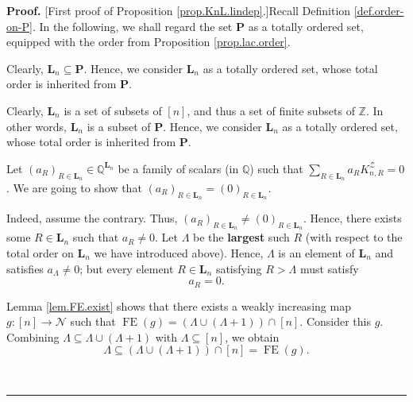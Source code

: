 \documentclass[numbers=enddot,12pt,final,onecolumn,notitlepage]{scrartcl}%
\theoremstyle{definition}
\newenvironment{proof}[1][Proof]{\noindent\textbf{#1.} }{\ \rule{0.5em}{0.5em}}
\newenvironment{verlong}{}{}
\newenvironment{vershort}{}{}
\let\sumnonlimits\sum
\renewcommand{\sum}{\sumnonlimits\limits}
\begin{document}
\begin{proof}
[First proof of Proposition \ref{prop.KnL.lindep}.]Recall Definition
\ref{def.order-on-P}. In the following, we shall regard the set $\mathbf{P}$
as a totally ordered set, equipped with the order from Proposition
\ref{prop.lac.order}.

\begin{vershort}
Clearly, $\mathbf{L}_{n}\subseteq\mathbf{P}$. Hence, we consider
$\mathbf{L}_{n}$ as a totally ordered set, whose total order is inherited from
$\mathbf{P}$.
\end{vershort}

\begin{verlong}
Clearly, $\mathbf{L}_{n}$ is a set of subsets of $\left[  n\right]  $, and
thus a set of finite subsets of $\mathbb{Z}$. In other words, $\mathbf{L}_{n}$
is a subset of $\mathbf{P}$. Hence, we consider $\mathbf{L}_{n}$ as a totally
ordered set, whose total order is inherited from $\mathbf{P}$.
\end{verlong}

Let $\left(  a_{R}\right)  _{R\in\mathbf{L}_{n}}\in\mathbb{Q}^{\mathbf{L}_{n}%
}$ be a family of scalars (in $\mathbb{Q}$) such that $\sum_{R\in
\mathbf{L}_{n}}a_{R}K_{n,R}^{\mathcal{Z}}=0$. We are going to show that
$\left(  a_{R}\right)  _{R\in\mathbf{L}_{n}}=\left(  0\right)  _{R\in
\mathbf{L}_{n}}$.

Indeed, assume the contrary. Thus, $\left(  a_{R}\right)  _{R\in\mathbf{L}%
_{n}}\neq\left(  0\right)  _{R\in\mathbf{L}_{n}}$. Hence, there exists some
$R\in\mathbf{L}_{n}$ such that $a_{R}\neq0$. Let $\Lambda$ be the
\textbf{largest} such $R$ (with respect to the total order on $\mathbf{L}_{n}$
we have introduced above). Hence, $\Lambda$ is an element of $\mathbf{L}_{n}$
and satisfies $a_{\Lambda}\neq0$; but every element $R\in\mathbf{L}_{n}$
satisfying $R>\Lambda$ must satisfy%
\begin{equation}
a_{R}=0. \label{pf.prop.KnL.lindep.larger=0}%
\end{equation}


Lemma \ref{lem.FE.exist} shows that there exists a weakly increasing map
$g:\left[  n\right]  \rightarrow\mathcal{N}$ such that $\operatorname*{FE}%
\left(  g\right)  =\left(  \Lambda\cup\left(  \Lambda+1\right)  \right)
\cap\left[  n\right]  $. Consider this $g$. Combining $\Lambda\subseteq
\Lambda\cup\left(  \Lambda+1\right)  $ with $\Lambda\subseteq\left[  n\right]
$, we obtain
\[
\Lambda\subseteq\left(  \Lambda\cup\left(  \Lambda+1\right)  \right)
\cap\left[  n\right]  =\operatorname*{FE}\left(  g\right)  .
\]



\end{proof}
\end{document}
